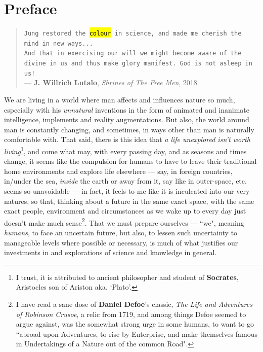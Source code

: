 \documentclass[a4paper, 18pt]{book} %
\begin{document}
\chapter{Preface}
\label{SECPREFACE}

\begin{quotation}
\noindent \texttt{Jung restored the \hl{colour} in science, and made me cherish the mind in new ways...}\\
\texttt{And that in exercising our will we might become aware of the divine in us and thus make glory manifest. God is not asleep in us!}\\
\hspace*{\fill} --- \textbf{J. Willrich Lutalo}, \textit{Shrines of The Free Men}, 2018\cite{shrinesjwl}
\end{quotation}

We are living in a world where man affects and influences nature so much, especially with his \textit{unnatural} inventions in the form of animated and inanimate intelligence, implements and reality augmentations. But also, the world around man is constantly changing, and sometimes, in ways other than man is naturally comfortable with. That said, there is this idea that \textit{a life unexplored isn't worth living}\footnote{I trust, it is attributed to ancient philosopher and student of \textbf{Socrates}, Aristocles son of Ariston aka. `Plato'.}, and come what may, with every passing day, and as seasons and times change, it seems like the compulsion for humans to have to leave their traditional home environments and explore life elsewhere --- say, in foreign countries, in/under the sea, \textit{inside} the earth or away from it, say like in outer-space, etc. seems so unavoidable --- in fact, it feels to me like it is inculcated into our very natures, so that, thinking about a future in the same exact space, with the same exact people, environment and circumstances as we wake up to every day just doesn't make much sense\footnote{I have read a sane dose of \textbf{Daniel Defoe}'s classic, \textit{The Life and Adventures of Robinson Crusoe}, a relic from 1719, and among things Defoe seemed to argue against, was the somewhat strong urge in some humans, to want to go ``abroad upon Adventures, to rise by Enterprise, and make themselves famous in Undertakings of a Nature out of the common Road".}. That we must prepare ourselves --- ``we", meaning \textit{humans}, to face an uncertain future, but also, to lessen such uncertainty to manageable levels where possible or necessary, is much of what justifies our investments in and explorations of science and knowledge in general. 
\end{document}
